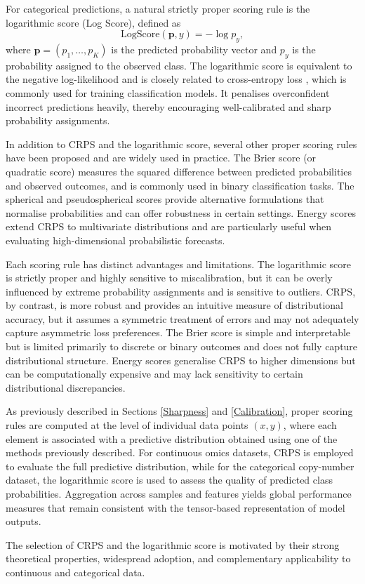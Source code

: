 For categorical predictions, a natural strictly proper scoring rule is the logarithmic score (Log Score), defined as
\begin{equation}
\mathrm{LogScore}(\mathbf{p}, y) = -\log p_y,
\end{equation}
where $\mathbf{p} = (p_1, \dots, p_K)$ is the predicted probability vector and $p_y$ is the probability assigned to the observed class. The logarithmic score is equivalent to the negative log-likelihood and is closely related to cross-entropy loss \citep{Good1952Rational}, which is commonly used for training classification models.
It penalises overconfident incorrect predictions heavily, thereby encouraging well-calibrated and sharp probability assignments.

In addition to CRPS and the logarithmic score, several other proper scoring rules have been proposed and are widely used in practice. The Brier score (or quadratic score) measures the squared difference between predicted probabilities and observed outcomes, and is commonly used in binary classification tasks. The spherical and pseudospherical scores provide alternative formulations that normalise probabilities and can offer robustness in certain settings. Energy scores extend CRPS to multivariate distributions and are particularly useful when evaluating high-dimensional probabilistic forecasts.

Each scoring rule has distinct advantages and limitations. The logarithmic score is strictly proper and highly sensitive to miscalibration, but it can be overly influenced by extreme probability assignments and is sensitive to outliers. CRPS, by contrast, is more robust and provides an intuitive measure of distributional accuracy, but it assumes a symmetric treatment of errors and may not adequately capture asymmetric loss preferences.
The Brier score is simple and interpretable but is limited primarily to discrete or binary outcomes and does not fully capture distributional structure. Energy scores generalise CRPS to higher dimensions but can be computationally expensive and may lack sensitivity to certain distributional discrepancies.

As previously described in Sections \ref{Sharpness} and \ref{Calibration}, proper scoring rules are computed at the level of individual data points $(x,y)$, where each element is associated with a predictive distribution obtained using one of the methods previously described. For continuous omics datasets, CRPS is employed to evaluate the full predictive distribution, while for the categorical copy-number dataset, the logarithmic score is used to assess the quality of predicted class probabilities. Aggregation across samples and features yields global performance measures that remain consistent with the tensor-based representation of model outputs.

The selection of CRPS and the logarithmic score is motivated by their strong theoretical properties, widespread adoption, and complementary applicability to continuous and categorical data.